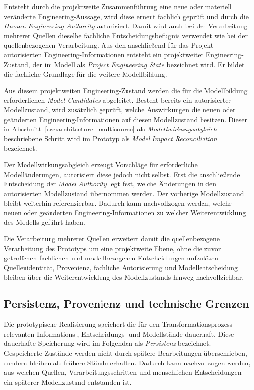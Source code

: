 Entsteht durch die projektweite Zusammenführung eine neue oder materiell
veränderte Engineering-Aussage, wird diese erneut fachlich geprüft und
durch die \emph{Human Engineering Authority} autorisiert. Damit wird auch
bei der Verarbeitung mehrerer Quellen dieselbe fachliche
Entscheidungsbefugnis verwendet wie bei der quellenbezogenen Verarbeitung.
Aus den anschließend für das Projekt autorisierten
Engineering-Informationen entsteht ein projektweiter Engineering-Zustand,
der im Modell als \emph{Project Engineering State} bezeichnet wird. Er
bildet die fachliche Grundlage für die weitere Modellbildung.

Aus diesem projektweiten Engineering-Zustand werden die für die
Modellbildung erforderlichen \emph{Model Candidates} abgeleitet. Besteht
bereits ein autorisierter Modellzustand, wird zusätzlich geprüft, welche
Auswirkungen die neuen oder geänderten Engineering-Informationen auf diesen
Modellzustand besitzen. Dieser in
Abschnitt~\ref{sec:architecture_multisource} als
\emph{Modellwirkungsabgleich} beschriebene Schritt wird im Prototyp als
\emph{Model Impact Reconciliation} bezeichnet.

Der Modellwirkungsabgleich erzeugt Vorschläge für erforderliche
Modelländerungen, autorisiert diese jedoch nicht selbst. Erst die
anschließende Entscheidung der \emph{Model Authority} legt fest, welche
Änderungen in den autorisierten Modellzustand übernommen werden. Der
vorherige Modellzustand bleibt weiterhin referenzierbar. Dadurch kann
nachvollzogen werden, welche neuen oder geänderten
Engineering-Informationen zu welcher Weiterentwicklung des Modells geführt
haben.

Die Verarbeitung mehrerer Quellen erweitert damit die quellenbezogene
Verarbeitung des Prototyps um eine projektweite Ebene, ohne die zuvor
getroffenen fachlichen und modellbezogenen Entscheidungen aufzulösen.
Quellenidentität, Provenienz, fachliche Autorisierung und Modellentscheidung
bleiben über die Weiterentwicklung des Modellzustands hinweg
nachvollziehbar.

\subsection{Persistenz, Provenienz und technische Grenzen}
\label{sec:implementation_persistence_limits}

Die prototypische Realisierung speichert die für den Transformationsprozess
relevanten Informations-, Entscheidungs- und Modellstände dauerhaft. Diese
dauerhafte Speicherung wird im Folgenden als \emph{Persistenz} bezeichnet.
Gespeicherte Zustände werden nicht durch spätere Bearbeitungen überschrieben,
sondern bleiben als frühere Stände erhalten. Dadurch kann nachvollzogen
werden, aus welchen Quellen, Verarbeitungsschritten und menschlichen
Entscheidungen ein späterer Modellzustand entstanden ist.

